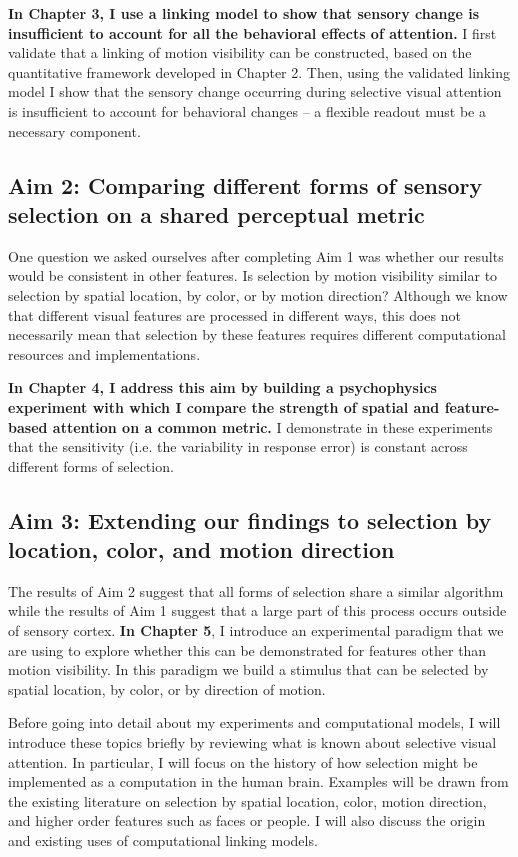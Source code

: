 \textbf{In Chapter 3, I use a linking model to show that sensory change is insufficient to account for all the behavioral effects of attention.} I first validate that a linking of motion visibility can be constructed, based on the quantitative framework developed in Chapter 2. Then, using the validated linking model I show that the sensory change occurring during selective visual attention is insufficient to account for behavioral changes -- a flexible readout must be a necessary component.

\subsection{Aim 2: Comparing different forms of sensory selection on a shared perceptual metric}

One question we asked ourselves after completing Aim 1 was whether our results would be consistent in other features. Is selection by motion visibility similar to selection by spatial location, by color, or by motion direction? Although we know that different visual features are processed in different ways, this does not necessarily mean that selection by these features requires different computational resources and implementations.

\textbf{In Chapter 4, I address this aim by building a psychophysics experiment with which I compare the strength of spatial and feature-based attention on a common metric.} I demonstrate in these experiments that the sensitivity (i.e. the variability in response error) is constant across different forms of selection. 

\subsection{Aim 3: Extending our findings to selection by location, color, and motion direction}

The results of Aim 2 suggest that all forms of selection share a similar algorithm while the results of Aim 1 suggest that a large part of this process occurs outside of sensory cortex. \textbf{In Chapter 5}, I introduce an experimental paradigm that we are using to explore whether this can be demonstrated for features other than motion visibility. In this paradigm we build a stimulus that can be selected by spatial location, by color, or by direction of motion.

\break

Before going into detail about my experiments and computational models, I will introduce these topics briefly by reviewing what is known about selective visual attention. In particular, I will focus on the history of how selection might be implemented as a computation in the human brain. Examples will be drawn from the existing literature on selection by spatial location, color, motion direction, and higher order features such as faces or people. I will also discuss the origin and existing uses of computational linking models.

